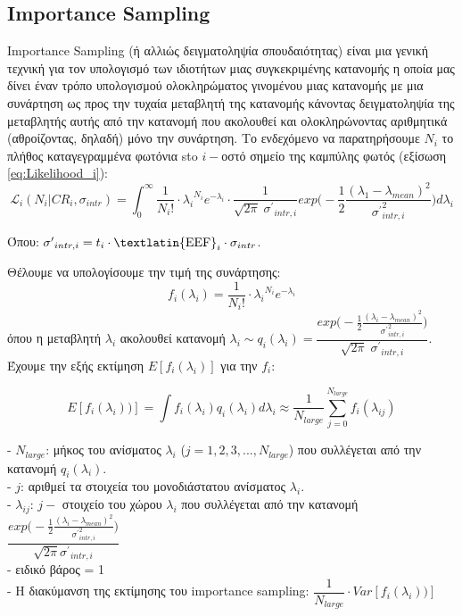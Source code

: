 
\subsection{\textlatin{Importance Sampling}}

\textlatin{Importance Sampling} (ή αλλιώς δειγματοληψία σπουδαιότητας) είναι μια γενική τεχνική για τον υπολογισμό των ιδιοτήτων μιας συγκεκριμένης κατανομής η οποία μας δίνει έναν τρόπο υπολογισμού ολοκληρώματος γινομένου μιας κατανομής με μια συνάρτηση ως προς την τυχαία μεταβλητή της κατανομής κάνοντας δειγματοληψία της μεταβλητής αυτής από την κατανομή που ακολουθεί και ολοκληρώνοντας αριθμητικά (αθροίζοντας, δηλαδή) μόνο την συνάρτηση.
Το ενδεχόμενο να παρατηρήσουμε $N_i$ το πλήθος καταγεγραμμένα φωτόνια sto $i-$οστό σημείο της καμπύλης φωτός (εξίσωση \ref{eq:Likelihood_i}):
$$   \mathcal{L}_i (N_i|CR_i, \sigma_{intr})  =  \int_0^\infty  \frac{1}{N_i!} \cdot{\lambda_i}^{N_i} e^{-\lambda_i} \cdot \frac{1}{\sqrt{2\pi} \; {\sigma^\prime}_{ intr, i}} exp \Big(-\frac{1}{2} \frac{( \lambda_1-\lambda_{mean} )^2}{{\sigma^\prime}_{ intr, i}^2}  \Big) d\lambda_i  $$

Όπου: ${\sigma^\prime}_{ intr, i} = t_i \cdot \mbox{\textlatin{EEF}}_i \cdot\sigma_{intr} $.  

Θέλουμε να υπολογίσουμε την τιμή της συνάρτησης:
$${f_i}(\lambda_i)=  \frac{1}{N_i!} \cdot{\lambda_i}^{N_i} e^{-\lambda_i} $$ όπου η μεταβλητή $\lambda_i$ ακολουθεί κατανομή $\lambda_i \sim {q_i} (\lambda_i) = \dfrac{exp \big(-\frac{1}{2} \frac{( \lambda_i-\lambda_{mean} )^2}{{\sigma^\prime}_{ intr, i}^2}  \big)} {\sqrt{2\pi}  \; {\sigma^\prime}_{ intr, i}}$. \\ 
Έχουμε την εξής εκτίμηση $E[f_i(\lambda_i)]$ για την ${f_i}$:

\begin{equation} E[{f_i}(\lambda_i))] = \int {f_i}(\lambda_i) {q_i} (\lambda_i)d\lambda_i \approx \dfrac{1}{N_{large}} \sum_{j=0}^{N_{large}} {f_i}(\lambda_{ij}) \label{eq:ImportanceSampling}\end{equation}

- $ N_{large}$: μήκος του ανίσματος $\lambda_i$ ($j=1,2,3,..., N_{large}$) που συλλέγεται από την κατανομή ${q_i} (\lambda_i)$.\\
- $j$: αριθμεί τα στοιχεία του μονοδιάστατου ανίσματος $\lambda_i$.\\
- $\lambda_{ij}$: $j-$ στοιχείο του χώρου $\lambda_i$ που συλλέγεται από την κατανομή $\dfrac{exp \big(-\frac{1}{2} \frac{( \lambda_i-\lambda_{mean} )^2}{{\sigma^\prime}_{ intr, i}^2}  \big)} {\sqrt{2\pi} {\sigma^\prime}_{ intr, i}}$\\
- ειδικό βάρος = 1\\
- Η διακύμανση της εκτίμησης του \textlatin{importance sampling}:
$ \dfrac{1}{N_{large}} \cdot Var[{f_i}(\lambda_i))] $\\

